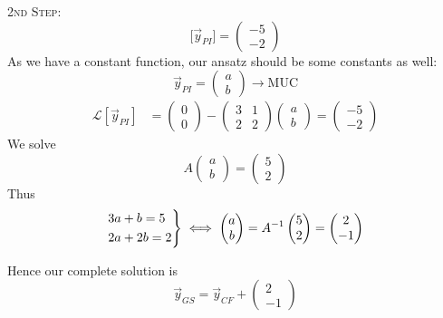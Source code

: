 \documentclass[10pt]{scrartcl}
\begin{document}
\begin{example}
\textsc{2nd Step:}
\[
  \mathcal[\vec{y}_{PI}] = \begin{pmatrix}
  -5 \\ -2
\end{pmatrix}
\]
As we have a constant function, our ansatz should be some constants as well: 
\[
  \vec{y}_{PI} = \begin{pmatrix}
  a \\ b
\end{pmatrix}
\longrightarrow \mathrm{MUC}
\]
\begin{align*}
  \mathcal{L}[\vec{y}_{PI}] &= \begin{pmatrix}
  0 \\ 0
\end{pmatrix} - 
\begin{pmatrix}
  3 & 1 \\ 2 & 2
\end{pmatrix}\begin{pmatrix}
  a \\ b
\end{pmatrix}= 
\begin{pmatrix}
  -5 \\ -2
\end{pmatrix}
\end{align*}
We solve 
\[
  A\begin{pmatrix}
  a \\ b
\end{pmatrix} = 
\begin{pmatrix}
  5 \\ 2
\end{pmatrix}
\]
Thus 
\begin{align*}
  \begin{rcases*}
  3a + b = 5\\
  2a + 2b = 2	
  \end{rcases*}\iff 
\begin{pmatrix}
  a \\ b 
\end{pmatrix} = A^{-1}
\begin{pmatrix}
  5 \\ 2 
\end{pmatrix}=
\begin{pmatrix}
  2 \\ -1
\end{pmatrix}
\end{align*}

Hence our complete solution is 
\[
  \vec{y}_{GS} =  \vec{y}_{CF} + 
  \begin{pmatrix}
  2\\ -1
\end{pmatrix}
\]
\end{example}
\end{document}
